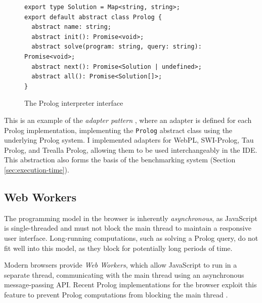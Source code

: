 \begin{figure}[H]
\centering
\begin{verbatim}
export type Solution = Map<string, string>;
export default abstract class Prolog {
  abstract name: string;
  abstract init(): Promise<void>;
  abstract solve(program: string, query: string): Promise<void>;
  abstract next(): Promise<Solution | undefined>;
  abstract all(): Promise<Solution[]>;
}
\end{verbatim}
\caption{The Prolog interpreter interface}
\label{fig:prolog-interface}
\end{figure}

\vspace*{-1.5em}

This is an example of the \emph{adapter pattern} \cite{gammaDesignPatternsElements1995}, where an adapter is defined for each Prolog implementation, implementing the \texttt{Prolog} abstract class using the underlying Prolog system. I implemented adapters for WebPL, SWI-Prolog, Tau Prolog, and Trealla Prolog, allowing them to be used interchangeably in the IDE. This abstraction also forms the basis of the benchmarking system (Section \ref{sec:execution-time}).

\subsection{Web Workers}

The programming model in the browser is inherently \emph{asynchronous}, as JavaScript is single-threaded and must not block the main thread to maintain a responsive user interface. Long-running computations, such as solving a Prolog query, do not fit well into this model, as they block for potentially long periods of time.

Modern browsers provide \emph{Web Workers}, which allow JavaScript to run in a separate thread, communicating with the main thread using an asynchronous message-passing API. Recent Prolog implementations for the browser exploit this feature to prevent Prolog computations from blocking the main thread \cite{garcia-pradalessCASPInBrowserPlayground2022, riazaTauPrologProlog2024}.

